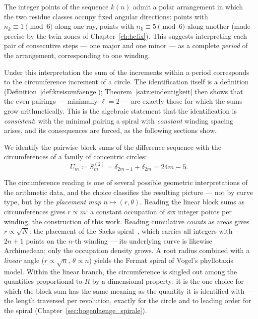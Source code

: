\begin{tcolorbox}[
  title={Justification of the circumference identification},
  colback=blue!3,
  colframe=blue!40!black,
  enhanced,
  breakable
]
The integer points of the sequence $k(n)$ admit a polar arrangement in
which the two residue classes occupy fixed angular directions: points
with $n_k \equiv 1 \pmod{6}$ along one ray, points with
$n_k \equiv 5 \pmod{6}$ along another (made precise by the twin zones of
Chapter~\ref{ch:helix}). This suggests interpreting each pair of
consecutive steps --- one major and one minor --- as a complete
\emph{period} of the arrangement, corresponding to one winding.

Under this interpretation the sum of the increments within a period
corresponds to the circumference increment of a circle. The
identification itself is a definition
(Definition~\ref{def:kreisumfaenge}); Theorem~\ref{satz:eindeutigkeit}
then shows that the even pairings --- minimally $\ell = 2$ --- are
exactly those for which the sums grow arithmetically. This is the
algebraic statement that the identification is \emph{consistent}: with
the minimal pairing a spiral with \emph{constant} winding spacing
arises, and its consequences are forced, as the following sections show.
\end{tcolorbox}

\begin{definition}\label{def:kreisumfaenge}
We identify the pairwise block sums of the difference sequence
with the circumferences of a family of concentric circles:
\[
  U_m \coloneqq S_m^{(2)} = \delta_{2m-1} + \delta_{2m} = 24m - 5.
\]
\end{definition}

\begin{remark}\label{rem:placement_classification}
The circumference reading is one of several possible geometric
interpretations of the arithmetic data, and the choice classifies the
resulting picture --- not by curve type, but by the \emph{placement map}
$n \mapsto (r, \theta)$. Reading the linear block sums as circumferences
gives $r \propto m$: a constant occupation of six integer points per
winding, the construction of this work. Reading cumulative \emph{counts}
as areas gives $r \propto \sqrt{N}$: the placement of the Sacks
spiral~\cite{Sacks2003}, which carries all integers with $2n+1$ points
on the $n$-th winding --- its underlying curve is likewise Archimedean;
only the occupation density grows. A root radius combined with a
\emph{linear} angle ($r \propto \sqrt{n}$, $\theta \propto n$) yields
the Fermat spiral of Vogel's phyllotaxis model. Within the linear
branch, the circumference is singled out among the quantities
proportional to $R$ by a dimensional property: it is the one choice for
which the block sum has the same meaning as the quantity it is
identified with --- the length traversed per revolution, exactly for the
circle and to leading order for the spiral
(Chapter~\ref{sec:bogenlaenge_spirale}).
\end{remark}

